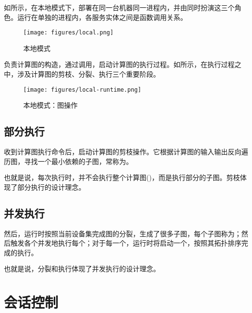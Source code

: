 \begin{content}

如所示，在本地模式下，部署在同一台机器同一进程内，并由同时扮演这三个角色。运行在单独的进程内，各服务实体之间是函数调用关系。

\begin{figure}[H]
\centering
\texttt{[image: figures/local.png]}
\caption{本地模式}
 \label{fig:local}
\end{figure}

负责计算图的构造，通过调用，启动计算图的执行过程。如所示，在执行过程之中，涉及计算图的剪枝、分裂、执行三个重要阶段。

\begin{figure}[H]
\centering
\texttt{[image: figures/local-runtime.png]}
\caption{本地模式：图操作}
 \label{fig:local-runtime}
\end{figure}

\subsection{部分执行}

收到计算图执行命令后，启动计算图的剪枝操作。它根据计算图的输入输出反向遍历图，寻找一个最小依赖的子图，常称为。

也就是说，每次执行时，并不会执行整个计算图()，而是执行部分的子图。剪枝体现了\tf{}部分执行的设计理念。

\subsection{并发执行}

然后，运行时按照当前设备集完成图的分裂，生成了很多子图，每个子图称为；然后触发各个并发地执行每个；对于每一个，运行时将启动一个，按照其拓扑排序完成的执行。

也就是说，分裂和执行体现了\tf{}并发执行的设计理念。

\end{content}

\section{会话控制}


